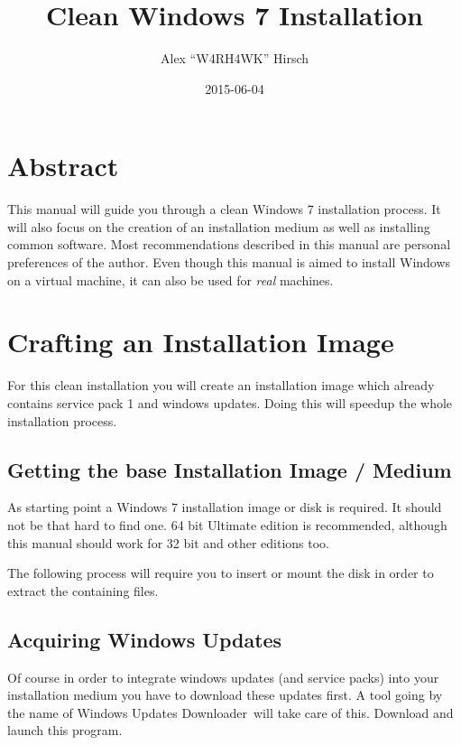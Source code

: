\documentclass{itsarticle}
\title{Clean Windows 7 Installation}
\author{Alex ``W4RH4WK'' Hirsch}
\date{2015-06-04}
\begin{document}
\maketitle

\section*{Abstract}
\label{sec:abstract}

This manual will guide you through a clean Windows 7 installation process. It
will also focus on the creation of an installation medium as well as installing
common software. Most recommendations described in this manual are personal
preferences of the author. Even though this manual is aimed to install Windows
on a virtual machine, it can also be used for \emph{real} machines.

\tableofcontents

\newpage

\section{Crafting an Installation Image}
\label{sec:install_image}

For this clean installation you will create an installation image which already
contains service pack 1 and windows updates. Doing this will speedup the whole
installation process.

\subsection{Getting the base Installation Image / Medium}
\label{sub:win7_base_iso}

As starting point a Windows 7 installation image or disk is required. It
should not be that hard to find one. 64 bit Ultimate edition is recommended,
although this manual should work for 32 bit and other editions too.

The following process will require you to insert or mount the disk in order to
extract the containing files.

\subsection{Acquiring Windows Updates}
\label{sub:get_win7_updates}

Of course in order to integrate windows updates (and service packs) into your
installation medium you have to download these updates first. A tool going by
the name of Windows Updates Downloader\footnotemark\ will take care of this.
Download and launch this program.
\end{document}
